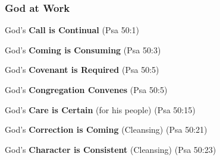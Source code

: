 \subsubsection{God at Work}
\begin{compactenum}[I.]
    \item God's \textbf{Call is Continual}  (Psa 50:1)
    \item God's \textbf{Coming is Consuming}  (Psa 50:3)
    \item God's \textbf{Covenant is Required}  (Psa 50:5)
    \item God's \textbf{Congregation Convenes}  (Psa 50:5)
    \item God's \textbf{Care is Certain} (for his people)  (Psa 50:15)
    \item God's \textbf{Correction is Coming} (Cleansing)  (Psa 50:21)
    \item God's \textbf{Character is Consistent} (Cleansing)  (Psa 50:23)
\end{compactenum}

